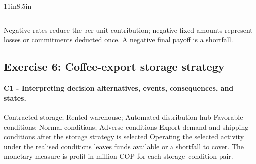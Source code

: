 \begin{CalculationLandscape}{11in}{8.5in}
{\begin{tabular}{@{}lccc@{}}
\bottomrule
\end{tabular}
}
Negative rates reduce the per-unit contribution; negative fixed amounts represent losses or commitments deducted once. A negative final payoff is a shortfall.

	\begingroup\renewcommand{\CalculationStateCount}{3}
\endgroup
\end{CalculationLandscape}

	
	\subsection{Exercise 6: Coffee-export storage strategy}
	\label{sec:problem6-coffee-export-storage-strategy-c1-c2}
	
	\paragraph*{C1 - Interpreting decision alternatives, events, consequences, and states.}
	\label{subsec:problem6-coffee-export-storage-strategy-c1}
	\DecisionElementsTable
{Contracted storage; Rented warehouse; Automated distribution hub}
{Favorable conditions; Normal conditions; Adverse conditions}
{Export-demand and shipping conditions after the storage strategy is selected}
{Operating the selected activity under the realised conditions leaves funds available or a shortfall to cover. The monetary measure is profit in million COP for each storage--condition pair.}

	
	
